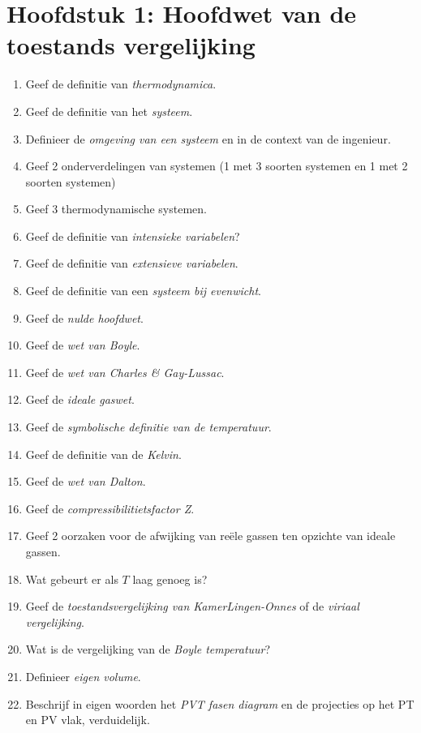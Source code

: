 \documentclass[12pt]{article}
\begin{document}
    \maketitle

	\section{Hoofdstuk 1: Hoofdwet van de toestands vergelijking}%
	\label{sec:Hoofdstuk_1}
	\begin{enumerate}
		\item Geef de definitie van \emph{thermodynamica}.
		\item Geef de definitie van het \emph{systeem}.
		\item Definieer de \emph{omgeving van een systeem} en in de context van de ingenieur.
		\item Geef 2 onderverdelingen van systemen (1 met 3 soorten systemen en 1 met 2 soorten systemen)
		\item Geef 3 thermodynamische systemen.
		\item Geef de definitie van \emph{intensieke variabelen}?
		\item Geef de definitie van \emph{extensieve variabelen}.
		\item Geef de definitie van een \emph{systeem bij evenwicht}.
		\item Geef de \emph{nulde hoofdwet}.
		\item Geef de \emph{wet van Boyle}.
		\item Geef de \emph{wet van Charles \& Gay-Lussac}.
		\item Geef de \emph{ideale gaswet}.
		\item Geef de \emph{symbolische definitie van de temperatuur}.
		\item Geef de definitie van de \emph{Kelvin}.
		\item Geef de \emph{wet van Dalton}.
		\item Geef de \emph{compressibilitietsfactor Z}.
		\item Geef 2 oorzaken voor de afwijking van re\"ele gassen ten opzichte van ideale gassen.
		\item Wat gebeurt er als $T$ laag genoeg is?
		\item Geef de \emph{toestandsvergelijking van KamerLingen-Onnes} of de \emph{viriaal vergelijking}.
		\item Wat is de vergelijking van de \emph{Boyle temperatuur}?
		\item Definieer \emph{eigen volume}.
		\item Beschrijf in eigen woorden het \emph{PVT fasen diagram} en de projecties op het PT en PV vlak, verduidelijk.

\end{enumerate}
\end{document}
